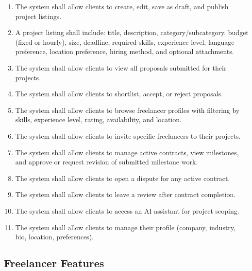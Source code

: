 \begin{enumerate}[label=FR-CLIENT-\arabic*]
  \item The system shall allow clients to create, edit, save as draft, and publish project listings.
  \item A project listing shall include: title, description, category/subcategory, budget (fixed or hourly), size, deadline, required skills, experience level, language preference, location preference, hiring method, and optional attachments.
  \item The system shall allow clients to view all proposals submitted for their projects.
  \item The system shall allow clients to shortlist, accept, or reject proposals.
  \item The system shall allow clients to browse freelancer profiles with filtering by skills, experience level, rating, availability, and location.
  \item The system shall allow clients to invite specific freelancers to their projects.
  \item The system shall allow clients to manage active contracts, view milestones, and approve or request revision of submitted milestone work.
  \item The system shall allow clients to open a dispute for any active contract.
  \item The system shall allow clients to leave a review after contract completion.
  \item The system shall allow clients to access an AI assistant for project scoping.
  \item The system shall allow clients to manage their profile (company, industry, bio, location, preferences).
\end{enumerate}

\subsection{Freelancer Features}

